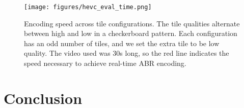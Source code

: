 \begin{figure}[t]
	\texttt{[image: figures/hevc\_eval\_time.png]}
	\caption{Encoding speed across tile configurations. The tile qualities alternate between high and low in a checkerboard pattern. Each configuration has an odd number of tiles, and we set the extra tile to be low quality. The video used was 30s long, so the red line indicates the speed necessary to achieve real-time ABR encoding.}
\end{figure}


\section{Conclusion}